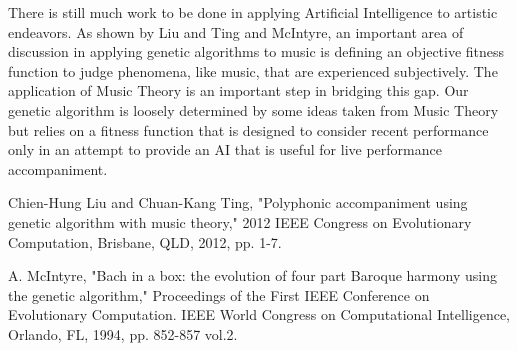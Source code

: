 \documentclass[conference]{IEEEtran}
\begin{document}
There is still much work to be done in applying Artificial Intelligence to artistic endeavors. As shown by Liu and Ting\cite{b1} and McIntyre\cite{b2}, an important area of discussion in applying genetic algorithms to music is defining an objective fitness function to judge phenomena, like music, that are experienced subjectively. The application of Music Theory is an important step in bridging this gap. Our genetic algorithm is loosely determined by some ideas taken from Music Theory but relies on a fitness function that is designed to consider recent performance only in an attempt to provide an AI that is useful for live performance accompaniment.

\begin{thebibliography}{1}
	
	Chien-Hung Liu and Chuan-Kang Ting, "Polyphonic accompaniment using genetic algorithm with music theory," 2012 IEEE Congress on Evolutionary Computation, Brisbane, QLD, 2012, pp. 1-7.
		
	A. McIntyre, "Bach in a box: the evolution of four part Baroque harmony using the genetic algorithm," Proceedings of the First IEEE Conference on Evolutionary Computation. IEEE World Congress on Computational Intelligence, Orlando, FL, 1994, pp. 852-857 vol.2.
			
	
	
\end{thebibliography}

	
\end{document}
